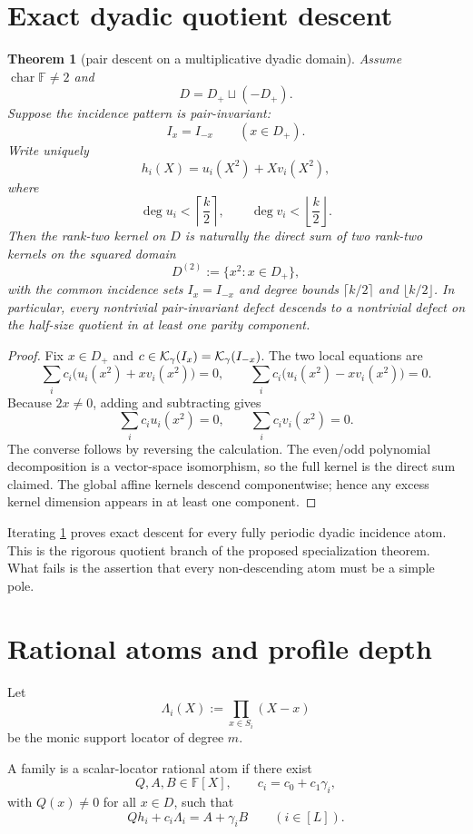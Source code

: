 \documentclass[11pt,a4paper]{amsart}
\numberwithin{equation}{section}
\newtheorem{theorem}{Theorem}[section]
\theoremstyle{remark}
\newcommand{\F}{\mathbb F}\newcommand{\B}{\mathbb B}\newcommand{\K}{\mathbb K}\newcommand{\Z}{\mathbb Z}
\begin{document}
\section{Exact dyadic quotient descent}

\begin{theorem}[pair descent on a multiplicative dyadic domain]\label{thm:pair-descent}
Assume $\operatorname{char}\F\ne2$ and
\[
 D=D_+\sqcup(-D_+).
\]
Suppose the incidence pattern is pair-invariant:
\[
 I_x=I_{-x}\qquad(x\in D_+).
\]
Write uniquely
\[
 h_i(X)=u_i(X^2)+Xv_i(X^2),
\]
where
\[
 \deg u_i<\left\lceil\frac{k}{2}\right\rceil,
 \qquad
 \deg v_i<\left\lfloor\frac{k}{2}\right\rfloor.
\]
Then the rank-two kernel on $D$ is naturally the direct sum of two rank-two kernels on the squared domain
\[
 D^{(2)}:=\{x^2:x\in D_+\},
\]
with the common incidence sets $I_x=I_{-x}$ and degree bounds $\lceil k/2\rceil$ and $\lfloor k/2\rfloor$.
In particular, every nontrivial pair-invariant defect descends to a nontrivial defect on the half-size quotient in at least one parity component.
\end{theorem}

\begin{proof}
Fix $x\in D_+$ and $c\in\mathcal K_\gamma(I_x)=\mathcal K_\gamma(I_{-x})$.  The two local equations are
\[
 \sum_i c_i\bigl(u_i(x^2)+xv_i(x^2)\bigr)=0,
 \qquad
 \sum_i c_i\bigl(u_i(x^2)-xv_i(x^2)\bigr)=0.
\]
Because $2x\ne0$, adding and subtracting gives
\[
 \sum_i c_i u_i(x^2)=0,
 \qquad
 \sum_i c_i v_i(x^2)=0.
\]
The converse follows by reversing the calculation.  The even/odd polynomial decomposition is a vector-space isomorphism, so the full kernel is the direct sum claimed.  The global affine kernels descend componentwise; hence any excess kernel dimension appears in at least one component.
\end{proof}

Iterating \cref{thm:pair-descent} proves exact descent for every fully periodic dyadic incidence atom.  This is the rigorous quotient branch of the proposed specialization theorem.  What fails is the assertion that every non-descending atom must be a simple pole.

\section{Rational atoms and profile depth}

Let
\[
 \Lambda_i(X):=\prod_{x\in S_i}(X-x)
\]
be the monic support locator of degree $m$.

\begin{definition}\label{def:rational-atom}
A family is a scalar-locator rational atom if there exist
\[
 Q,A,B\in\F[X],
 \qquad c_i=c_0+c_1\gamma_i,
\]
with $Q(x)\ne0$ for all $x\in D$, such that
\[
 \boxed{
 Qh_i+c_i\Lambda_i=A+\gamma_iB
 \qquad(i\in[L]).
 }
\]
\end{definition}
\end{document}
